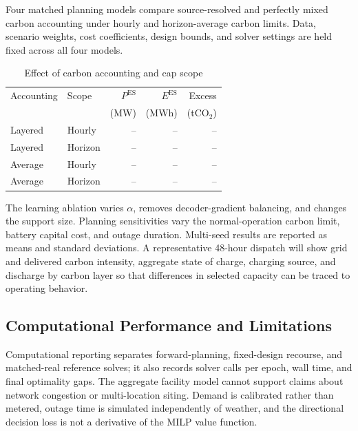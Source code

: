 \documentclass[times]{elsarticle}
\begin{document}
Four matched planning models compare source-resolved and perfectly mixed carbon
accounting under hourly and horizon-average carbon limits. Data, scenario
weights, cost coefficients, design bounds, and solver settings are held fixed
across all four models.

\begin{table}[t]
\centering
\caption{Effect of carbon accounting and cap scope}
\label{tab:carbon_ablation}
\begin{tabular}{@{}llrrr@{}}
\toprule
Accounting & Scope & $P^{\mathrm{ES}}$ & $E^{\mathrm{ES}}$ & Excess \\
& & (MW) & (MWh) & (tCO$_2$) \\
\midrule
Layered & Hourly & -- & -- & -- \\
Layered & Horizon & -- & -- & -- \\
Average & Hourly & -- & -- & -- \\
Average & Horizon & -- & -- & -- \\
\bottomrule
\end{tabular}
\end{table}


The learning ablation varies $\alpha$, removes decoder-gradient balancing, and
changes the support size. Planning sensitivities vary the normal-operation
carbon limit, battery capital cost, and outage duration. Multi-seed results are
reported as means and standard deviations. A representative 48-hour dispatch
will show grid and delivered carbon intensity, aggregate state of charge,
charging source, and discharge by carbon layer so that differences in selected
capacity can be traced to operating behavior.

\subsection{Computational Performance and Limitations}

Computational reporting separates forward-planning, fixed-design recourse, and
matched-real reference solves; it also records solver calls per epoch, wall
time, and final optimality gaps. The aggregate facility model cannot support
claims about network congestion or multi-location siting. Demand is calibrated
rather than metered, outage time is simulated independently of weather, and the
directional decision loss is not a derivative of the MILP value function.
\end{document}
